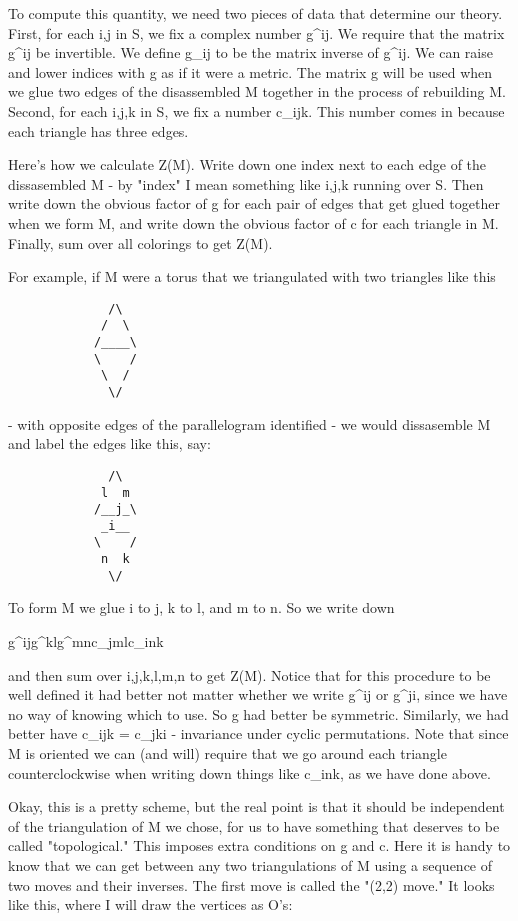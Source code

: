 To compute this quantity, we need two pieces of data that determine our
theory.  First, for each i,j in S, we fix a complex number g^{ij}.  
We require that the matrix g^{ij} be invertible.   We define g_{ij} to
be the matrix inverse of g^{ij}.  We can raise and lower indices with g
as if it were a metric.  The matrix g will be used when we glue two edges of
the disassembled M together in the process of rebuilding M.   Second,
for each i,j,k in S, we fix a number c_{ijk}.  This number comes in
because each triangle has three edges. 

Here's how we calculate Z(M).  Write down one index next to each edge
of the dissasembled M - by "index" I mean something like i,j,k running
over S.  Then write down the obvious factor of g for each pair of edges that
get glued together when we form M, and write down the obvious factor of
c for each triangle in M.  Finally, sum over all colorings to get Z(M).  

For example, if M were a torus that we triangulated with two triangles
like this 
                 
\begin{verbatim}
              /\
             /  \
            /____\
            \    /   
             \  /          
              \/     
\end{verbatim}
    

- with opposite edges of the parallelogram identified -  we would
dissasemble M and label the edges like this, say:

                
\begin{verbatim}
              /\
             l  m
            /__j_\
             _i__
            \    /   
             n  k          
              \/     
\end{verbatim}
    

To form M we glue i to j, k to l, and m to n.  So we write down

g^{ij}g^{kl}g^{mn}c_{jml}c_{ink}

and then sum over i,j,k,l,m,n to get Z(M).  Notice that for this
procedure to be well defined it had better not matter whether we write
g^{ij} or g^{ji}, since we have no way of knowing which to use.  So g
had better be symmetric.  Similarly, we had better have c_{ijk} =
c_{jki} - invariance under cyclic permutations.   Note that since M is
oriented we can (and will) require that we go around each triangle 
counterclockwise when writing down things like c_{ink}, as we have done
above.  

Okay, this is a pretty scheme, but the real point is that it should be
independent of the triangulation of M we chose, for us to have something
that deserves to be called "topological."  This imposes extra
conditions on g and c.  Here it is handy to know that we can get between
any two triangulations of M using a sequence of two moves and their
inverses.   The first move is called the "(2,2) move." It looks like
this, where I will draw the vertices as O's: 

